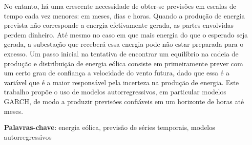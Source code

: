 \documentclass[
	12pt,				%
	openright,			%
	oneside,			%
	a4paper,			%
	english,			%
	french,				%
	spanish,			%
	brazil				%
	]{abntex2}
\begin{document}
\begin{resumo}
No entanto, há uma crescente necessidade de obter-se previsões em escalas de tempo cada vez menores: em meses, dias e horas. Quando a produção de energia prevista não corresponde a energia efetivamente gerada, as partes envolvidas perdem dinheiro. Até mesmo no caso em que mais energia do que o esperado seja gerada, a subestação que receberá essa energia pode não estar preparada para o excesso. Um passo inicial na tentativa de encontrar um equilíbrio na cadeia de produção e distribuição de energia eólica consiste em primeiramente prever com um certo grau de confiança a velocidade do vento futura, dado que essa é a variável que é a maior responsável pela incerteza na produção de energia. Este trabalho propõe o uso de modelos autorregressivos, em particular modelos GARCH, de modo a produzir previsões confiáveis em um horizonte de horas até meses.

 \textbf{Palavras-chave}: energia eólica, previsão de séries temporais, modelos autorregressivos
\end{resumo}
\end{document}
